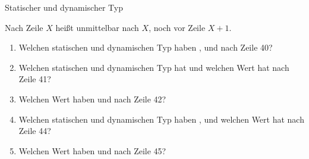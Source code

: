 \documentclass{../tuda-exercise}
\begin{document}
  \begin{task}[credit=\stars{2}{3}]{Statischer und dynamischer Typ}
    

    \clearpage

    

    \begin{note}[title=Hinweis:, color=tuda-orange]
      Nach Zeile \(X\) heißt unmittelbar nach \(X\), noch vor Zeile \(X + 1\).
    \end{note}

    \begin{enumerate}
      [label=(\arabic*)]
      \item Welchen statischen und dynamischen Typ haben ,  und
       nach Zeile 40?
      \item Welchen statischen und dynamischen Typ hat  und welchen Wert hat
       nach Zeile 41?
      \item Welchen Wert haben  und  nach Zeile 42?
      \item Welchen statischen und dynamischen Typ haben ,  und
      welchen Wert hat
       nach Zeile 44?
      \item Welchen Wert haben  und  nach Zeile 45?
    \end{enumerate}

    \clearpagesolution


\end{task}
\end{document}
